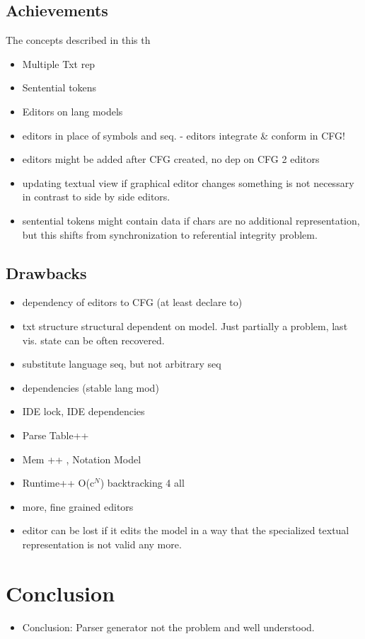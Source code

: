 \subsection{Achievements}
The concepts described in this th
\begin{itemize}
	\item Multiple Txt rep
	\item Sentential tokens
	\item Editors on lang models
	\item editors in place of symbols and seq. - editors integrate \& conform in CFG!
	\item editors might be added after CFG created, no dep on CFG 2 editors
	\item updating textual view if graphical editor changes something is not necessary in contrast to side by side editors.
	\item sentential tokens might contain data if chars are no additional representation, but this shifts from synchronization to referential integrity problem.
\end{itemize}

\subsection{Drawbacks}
\begin{itemize}
	\item dependency of editors to CFG (at least declare to)
	\item txt structure structural dependent on model. Just partially a problem, last vis. state can be often recovered.
	\item substitute language seq, but not arbitrary seq
	\item dependencies (stable lang mod)
	\item IDE lock, IDE dependencies
	\item Parse Table++
	\item Mem ++ , Notation Model
	\item Runtime++ O(c$^N$) backtracking 4 all
	\item more, fine grained editors
	\item editor can be lost if it edits the model in a way that the specialized textual representation is not valid any more.
\end{itemize}


\section{Conclusion}
\begin{itemize}
	\item Conclusion: Parser generator not the problem and well understood.
\end{itemize}	